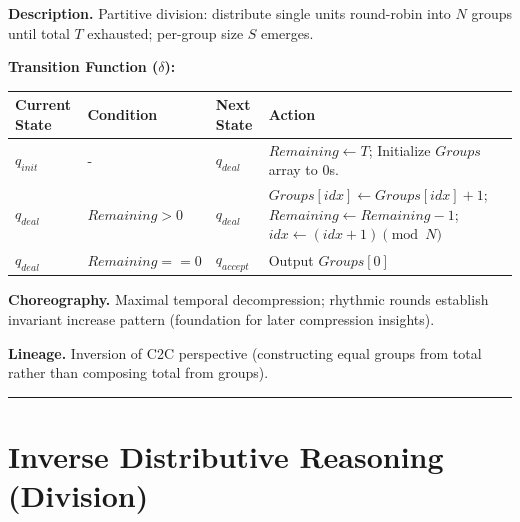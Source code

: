 \documentclass[12pt]{book}
\begin{document}
\textbf{Description.} Partitive division: distribute single units
round-robin into \(N\) groups until total \(T\) exhausted; per-group
size \(S\) emerges.

\textbf{Transition Function (\(\delta\)):}

\begin{longtable}[]{@{}
  >{\raggedright\arraybackslash}p{}
  >{\raggedright\arraybackslash}p{}
  >{\raggedright\arraybackslash}p{}
  >{\raggedright\arraybackslash}p{}@{}}
\toprule\noalign{}
\begin{minipage}[b]{\linewidth}\raggedright
Current State
\end{minipage} & \begin{minipage}[b]{\linewidth}\raggedright
Condition
\end{minipage} & \begin{minipage}[b]{\linewidth}\raggedright
Next State
\end{minipage} & \begin{minipage}[b]{\linewidth}\raggedright
Action
\end{minipage} \\
\midrule\noalign{}
\endhead
\bottomrule\noalign{}
\endlastfoot
\(q_{init}\) & - & \(q_{deal}\) & \(Remaining \leftarrow T\); Initialize
\(Groups\) array to 0s. \\
\(q_{deal}\) & \(Remaining > 0\) & \(q_{deal}\) &
\(Groups[idx] \leftarrow Groups[idx]+1\);
\(Remaining \leftarrow Remaining-1\);
\(idx \leftarrow (idx+1) \pmod N\) \\
\(q_{deal}\) & \(Remaining == 0\) & \(q_{accept}\) & Output
\(Groups[0]\) \\
\end{longtable}

\textbf{Choreography.} Maximal temporal decompression; rhythmic rounds
establish invariant increase pattern (foundation for later compression
insights).

\textbf{Lineage.} Inversion of C2C perspective (constructing equal
groups from total rather than composing total from groups).

\begin{center}\rule{0.5\linewidth}{0.5pt}\end{center}

\section{Inverse Distributive Reasoning
(Division)}\label{inverse-distributive-reasoning-division}
\end{document}

